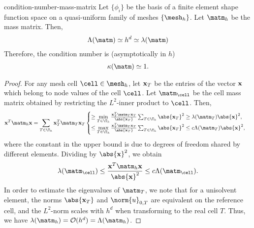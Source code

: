\begin{Lemma}{condition-number-mass-matrix}
  Let $\{\phi_i\}$ be the basis of a finite element shape function
  space on a quasi-uniform family of meshes $\{\mesh_h\}$. Let
  $\matm_h$ be the mass matrix. Then,
  \begin{gather*}
    \Lambda(\matm) \simeq h^{d} \simeq  \lambda(\matm)
  \end{gather*}
  Therefore, the condition number is (asymptotically in $h$)
  \begin{gather*}
    \kappa(\matm) \simeq 1.
  \end{gather*}
\end{Lemma}

\begin{proof}
  For any mesh cell
  $\cell\in\mesh_h$, let $\mathbf x_T$ be the entries of the vector $\mathbf x$ which
  belong to node values of the cell $\cell$. Let $\matm_\cell$ be the cell
  mass matrix obtained by restricting the $L^2$-inner product to
  $\cell$. Then,
  \begin{gather*}
    \vecx^T \matm_h \vecx
    = \sum_{T\in\T_h} \vecx^T_T \matm_T \vecx_T
    \begin{cases}
    \ge \min\limits_{T\in\T_h} \frac{\vecx^T_T \matm_T \vecx_T}{\abs{\vecx_T}} \sum_{T\in\T_h} \abs{\vecx_T}^2 \ge \lambda(\matm_T) \abs{\vecx}^2,\\
    \le \max\limits_{T\in\T_h} \frac{\vecx^T_T \matm_T \vecx_T}{\abs{\vecx_T}} \sum_{T\in\T_h} \abs{\vecx_T}^2 \le c \Lambda(\matm_T) \abs{\vecx}^2,
    \end{cases}
  \end{gather*}
  where the constant in the upper bound is due to degrees of freedom
  shared by different elements. Dividing by $\abs{\vecx}^2$, we
  obtain
  \begin{gather}
    \lambda(\matm_\cell) \le \frac{\vecx^T \matm_h \vecx}{\abs{\vecx}^2} \le c \Lambda(\matm_\cell).
  \end{gather}
  In order to estimate the eigenvalues of $\matm_T$, we note that for
  a unisolvent element, the norms $\abs{\vecx_T}$ and $\norm{u}_{0,T}$ are
  equivalent on the reference cell, and the $L^2$-norm scales with
  $h^d$ when transforming to the real cell $T$. Thus, we have
  $\lambda(\matm_h) = \mathcal O(h^{d}) = \Lambda(\matm_h)$.
\end{proof}

